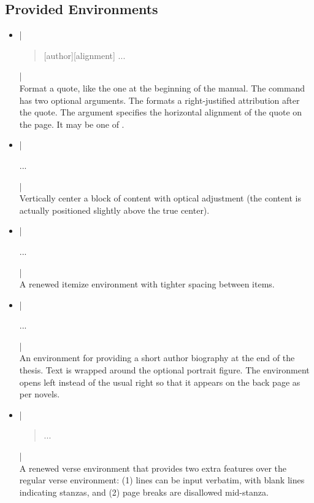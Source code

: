 \documentclass[thesis.tex]{subfiles}
\begin{document}
\subsection*{Provided Environments}
\begin{itemize}
\item \code|\begin{quote}[author][alignment] ... \end{quote}| \\
Format a quote, like the one at the beginning of the manual. The command has two optional arguments. The  formats a right-justified attribution after the quote. The  argument specifies the horizontal alignment of the quote on the page. It may be one of .
\item \code|\begin{verticenter} ... \end{verticenter}| \\
Vertically center a block of content with optical adjustment (the content is actually positioned slightly above the true center).
\item \code|\begin{tightemize} ... \end{tightemize}| \\
A renewed itemize environment with tighter spacing between items.
\item \code|\begin{biography} ... \end{biography}| \\
An environment for providing a short author biography at the end of the thesis. Text is wrapped around the optional portrait figure. The environment opens left instead of the usual right so that it appears on the back page as per novels.
\item \code|\begin{verse} ... \end{verse}| \\
A renewed verse environment that provides two extra features over the regular verse environment: (1) lines can be input verbatim, with blank lines indicating stanzas, and (2) page breaks are disallowed mid-stanza.
\end{itemize}
\end{document}
